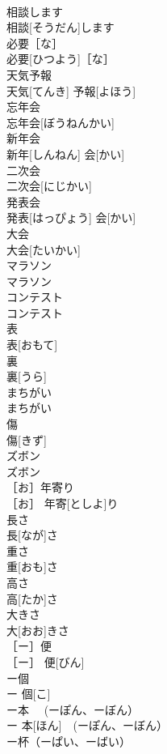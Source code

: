 \documentclass[8pt]{extreport}
\begin{document}
\begin{CJK}{UTF8}{min}
\\	相談します	
\\	相談[そうだん]します	
\\	必要［な］	
\\	必要[ひつよう]［な］	
\\	天気予報	
\\	天気[てんき] 予報[よほう]	
\\	忘年会	
\\	忘年会[ぼうねんかい]	
\\	新年会	
\\	新年[しんねん] 会[かい]	
\\	二次会	
\\	二次会[にじかい]	
\\	発表会	
\\	発表[はっぴょう] 会[かい]	
\\	大会	
\\	大会[たいかい]	
\\	マラソン	
\\	マラソン	
\\	コンテスト	
\\	コンテスト	
\\	表	
\\	表[おもて]	
\\	裏	
\\	裏[うら]	
\\	まちがい	
\\	まちがい	
\\	傷	
\\	傷[きず]	
\\	ズボン	
\\	ズボン	
\\	［お］年寄り	
\\	［お］ 年寄[としよ]り	
\\	長さ	
\\	長[なが]さ	
\\	重さ	
\\	重[おも]さ	
\\	高さ	
\\	高[たか]さ	
\\	大きさ	
\\	大[おお]きさ	
\\	［ー］便	
\\	［ー］ 便[びん]	
\\	ー個	
\\	ー 個[こ]	
\\	ー本 　(ーぽん、ーぼん）	
\\	ー 本[ほん]　(ーぽん、ーぼん）	
\\	ー杯（ーぱい、ーばい）	

\end{CJK}
\end{document}
